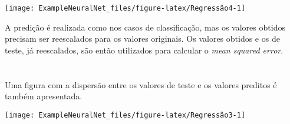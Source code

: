 \documentclass[
]{article}
\newenvironment{Shaded}{\begin{snugshade}}{\end{snugshade}}
\newcommand{\AttributeTok}[1]{\textcolor[rgb]{0.77,0.63,0.00}{#1}}
\newcommand{\CommentTok}[1]{\textcolor[rgb]{0.56,0.35,0.01}{\textit{#1}}}
\newcommand{\DecValTok}[1]{\textcolor[rgb]{0.00,0.00,0.81}{#1}}
\newcommand{\FunctionTok}[1]{\textcolor[rgb]{0.00,0.00,0.00}{#1}}
\newcommand{\NormalTok}[1]{#1}
\newcommand{\OtherTok}[1]{\textcolor[rgb]{0.56,0.35,0.01}{#1}}
\newcommand{\SpecialCharTok}[1]{\textcolor[rgb]{0.00,0.00,0.00}{#1}}
\newcommand{\StringTok}[1]{\textcolor[rgb]{0.31,0.60,0.02}{#1}}
\begin{document}
\begin{center}\texttt{[image: ExampleNeuralNet\_files/figure-latex/Regressão4-1]} \end{center}

A predição é realizada como nos casos de classificação, mas os valores
obtidos precisam ser reescalados para os valores originais. Os valores
obtidos e os de teste, já reescalados, são então utilizados para
calcular o \emph{mean squared error}.

\begin{Shaded}
\end{Shaded}

\hypertarget{section}{%
\section{}\label{section}}

Uma figura com a dispersão entre os valores de teste e os valores
preditos é também apresentada.

\begin{Shaded}
\end{Shaded}

\begin{center}\texttt{[image: ExampleNeuralNet\_files/figure-latex/Regressão3-1]} \end{center}
\end{document}
